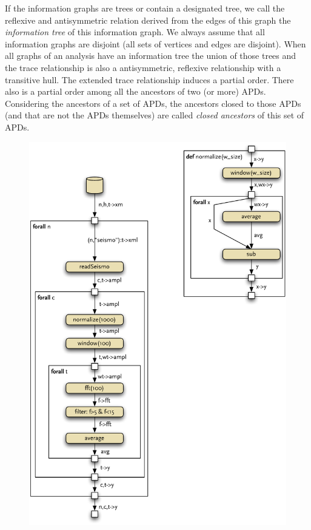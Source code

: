 If the information graphs are trees or contain a designated tree, we call the reflexive and antisymmetric relation derived from the edges of this graph the \emph{information tree} of this information graph. We always assume that all information graphs are disjoint (all sets of vertices and edges are disjoint). When all graphs of an analysis have an information tree the union of those trees and the trace relationship is also a antisymmetric, reflexive relationship with a transitive hull. The extended trace relationship induces a partial order. There also is a partial order among all the ancestors of two (or more) APDs. Considering the ancestors of a set of APDs, the ancestors closed to those APDs (and that are not the APDs themselves) are called \emph{closed ancestors} of this set of APDs.


\begin{figure}
  \centering
  \parbox{0.45\linewidth}{%
    \includegraphics[width=\linewidth]{figures/seismo_bus_composition}
}
\end{figure}
